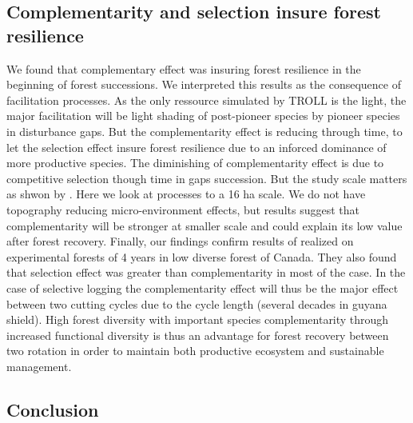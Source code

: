 \documentclass[12pt,]{article}
\theoremstyle{definition}
\theoremstyle{definition}
\theoremstyle{remark}
\begin{document}
\subsection{Complementarity and selection insure forest
resilience}\label{complementarity-and-selection-insure-forest-resilience}

We found that complementary effect was insuring forest resilience in the
beginning of forest successions. We interpreted this results as the
consequence of facilitation processes. As the only ressource simulated
by TROLL is the light, the major facilitation will be light shading of
post-pioneer species by pioneer species in disturbance gaps. But the
complementarity effect is reducing through time, to let the selection
effect insure forest resilience due to an inforced dominance of more
productive species. The diminishing of complementarity effect is due to
competitive selection though time in gaps succession. But the study
scale matters as shwon by \citet{Chisholm2013}. Here we look at
processes to a 16 ha scale. We do not have topography reducing
micro-environment effects, but \citet{Chisholm2013} results suggest that
complementarity will be stronger at smaller scale and could explain its
low value after forest recovery. Finally, our findings confirm results
of \citet{Tobner2016} realized on experimental forests of 4 years in low
diverse forest of Canada. They also found that selection effect was
greater than complementarity in most of the case. In the case of
selective logging the complementarity effect will thus be the major
effect between two cutting cycles due to the cycle length (several
decades in guyana shield). High forest diversity with important species
complementarity through increased functional diversity is thus an
advantage for forest recovery between two rotation in order to maintain
both productive ecosystem and sustainable management.

\subsection{Conclusion}\label{conclusion}
\end{document}
